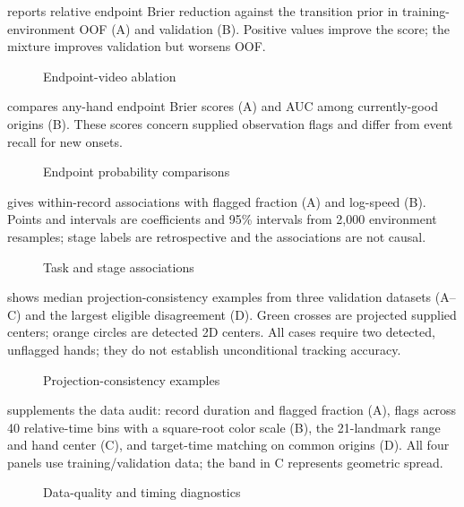  reports relative endpoint Brier reduction against the transition prior in training-environment OOF (A) and validation (B). Positive values improve the score; the mixture improves validation but worsens OOF.
\begin{figure}[!htbp]
\centering
{}
\caption{Endpoint-video ablation}
\label{fig:A4}
\end{figure}
\FloatBarrier

 compares any-hand endpoint Brier scores (A) and AUC among currently-good origins (B). These scores concern supplied observation flags and differ from event recall for new onsets.
\begin{figure}[!htbp]
\centering
{}
\caption{Endpoint probability comparisons}
\label{fig:A5}
\end{figure}
\FloatBarrier

 gives within-record associations with flagged fraction (A) and log-speed (B). Points and intervals are coefficients and 95\% intervals from 2,000 environment resamples; stage labels are retrospective and the associations are not causal.
\begin{figure}[!htbp]
\centering
{}
\caption{Task and stage associations}
\label{fig:A6}
\end{figure}
\FloatBarrier

 shows median projection-consistency examples from three validation datasets (A--C) and the largest eligible disagreement (D). Green crosses are projected supplied centers; orange circles are detected 2D centers. All cases require two detected, unflagged hands; they do not establish unconditional tracking accuracy.
\begin{figure}[!htbp]
\centering
{}
\caption{Projection-consistency examples}
\label{fig:A7}
\end{figure}
\FloatBarrier


 supplements the data audit: record duration and flagged fraction (A), flags across 40 relative-time bins with a square-root color scale (B), the 21-landmark range and hand center (C), and target-time matching on common origins (D). All four panels use training/validation data; the band in C represents geometric spread.
\begin{figure}[!htbp]
\centering
{}
\caption{Data-quality and timing diagnostics}
\label{fig:A8}
\end{figure}
\FloatBarrier

